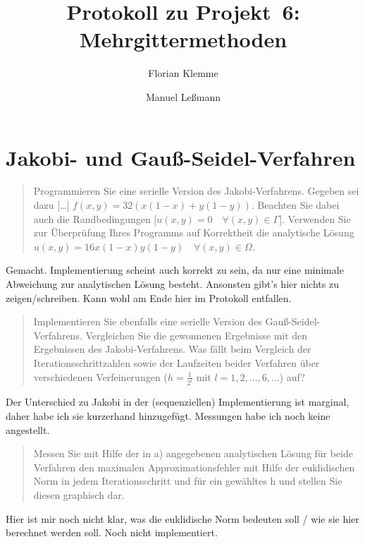 \documentclass[paper = a4]{scrartcl}
\begin{document}
\subject{Praktikum Multicore"=Programmierung}
\title{Protokoll zu Projekt~6: Mehrgittermethoden}
\author{Florian Klemme \and Manuel Leßmann}
\maketitle

\section{Jakobi- und Gauß-Seidel-Verfahren}

\begin{quote}
    Programmieren Sie eine serielle Version des Jakobi-Verfahrens. Gegeben sei dazu [\dots] \(f(x, y) = 32(x(1 - x) + y(1 - y))\). Beachten Sie dabei auch die Randbedingungen [\(u(x, y) = 0 \quad \forall (x, y) \in \Gamma\)]. Verwenden Sie zur Überprüfung Ihres Programms auf Korrektheit die analytische Lösung \(u(x, y) = 16x(1 - x)y(1 - y) \quad \forall (x, y) \in \Omega\).
\end{quote}

Gemacht. Implementierung scheint auch korrekt zu sein, da nur eine minimale Abweichung zur analytischen Lösung besteht. Ansonsten gibt's hier nichts zu zeigen/schreiben. Kann wohl am Ende hier im Protokoll entfallen.

\begin{quote}
    Implementieren Sie ebenfalls eine serielle Version des Gauß-Seidel-Verfahrens. Vergleichen Sie die gewonnenen Ergebnisse mit den Ergebnissen des Jakobi-Verfahrens. Was fällt beim Vergleich der Iterationsschrittzahlen sowie der Laufzeiten beider Verfahren über verschiedenen Verfeinerungen (\(h = \frac{1}{2^l} \text{ mit } l = 1, 2, \dots, 6, \dots\)) auf?
\end{quote}

Der Unterschied zu Jakobi in der (sequenziellen) Implementierung ist marginal, daher habe ich sie kurzerhand hinzugefügt. Messungen habe ich noch keine angestellt.

\begin{quote}
    Messen Sie mit Hilfe der in a) angegebenen analytischen Lösung für beide Verfahren den maximalen Approximationsfehler mit Hilfe der euklidischen Norm in jedem Iterationsschritt und für ein gewähltes h und stellen Sie diesen graphisch dar.
\end{quote}

Hier ist mir noch nicht klar, was die euklidische Norm bedeuten soll / wie sie hier berechnet werden soll. Noch nicht implementiert.
\end{document}
